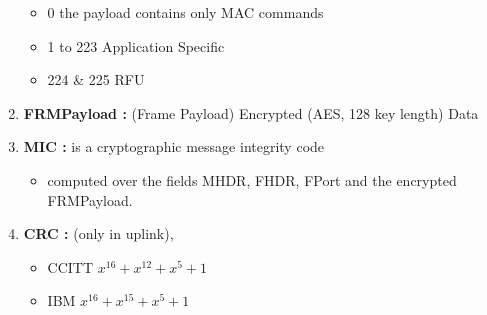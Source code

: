 \begin{landscape}
\begin{multicols}{2}
\begin{enumerate}
\begin{itemize}
		\item 0  the payload contains only MAC commands
		 \item 1 to 223  Application Specific
		 \item 224 \& 225  RFU
	\end{itemize}
    \item \textbf{FRMPayload :} (Frame Payload)  Encrypted (AES, 128 key length) Data                                 
	\item \textbf{MIC :}  is a cryptographic message integrity code
	\begin{itemize}
		\item computed over the fields MHDR, FHDR, FPort and the encrypted FRMPayload.
	\end{itemize}
	\item \textbf{CRC :} (only in uplink), 
	\begin{itemize}
		\item CCITT  $x^{16} + x^{12} + x^{5} + 1$
		\item IBM  $x^{16} + x^{15} + x^{5} + 1$
	\end{itemize}
\end{enumerate}

\end{multicols}


\end{landscape}


